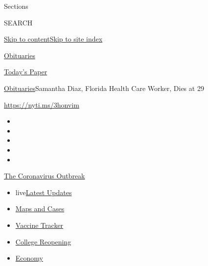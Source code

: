 Sections

SEARCH

\protect\hyperlink{site-content}{Skip to
content}\protect\hyperlink{site-index}{Skip to site index}

\href{https://www.nytimes.com/section/obituaries}{Obituaries}

\href{https://myaccount.nytimes.com/auth/login?response_type=cookie\&client_id=vi}{}

\href{https://www.nytimes.com/section/todayspaper}{Today's Paper}

\href{/section/obituaries}{Obituaries}\textbar{}Samantha Diaz, Florida
Health Care Worker, Dies at 29

\url{https://nyti.ms/3honvim}

\begin{itemize}
\item
\item
\item
\item
\item
\end{itemize}

\href{https://www.nytimes.com/news-event/coronavirus?action=click\&pgtype=Article\&state=default\&region=TOP_BANNER\&context=storylines_menu}{The
Coronavirus Outbreak}

\begin{itemize}
\tightlist
\item
  live\href{https://www.nytimes.com/2020/08/03/world/coronavirus-covid-19.html?action=click\&pgtype=Article\&state=default\&region=TOP_BANNER\&context=storylines_menu}{Latest
  Updates}
\item
  \href{https://www.nytimes.com/interactive/2020/us/coronavirus-us-cases.html?action=click\&pgtype=Article\&state=default\&region=TOP_BANNER\&context=storylines_menu}{Maps
  and Cases}
\item
  \href{https://www.nytimes.com/interactive/2020/science/coronavirus-vaccine-tracker.html?action=click\&pgtype=Article\&state=default\&region=TOP_BANNER\&context=storylines_menu}{Vaccine
  Tracker}
\item
  \href{https://www.nytimes.com/2020/08/02/us/covid-college-reopening.html?action=click\&pgtype=Article\&state=default\&region=TOP_BANNER\&context=storylines_menu}{College
  Reopening}
\item
  \href{https://www.nytimes.com/live/2020/08/03/business/stock-market-today-coronavirus?action=click\&pgtype=Article\&state=default\&region=TOP_BANNER\&context=storylines_menu}{Economy}
\end{itemize}

